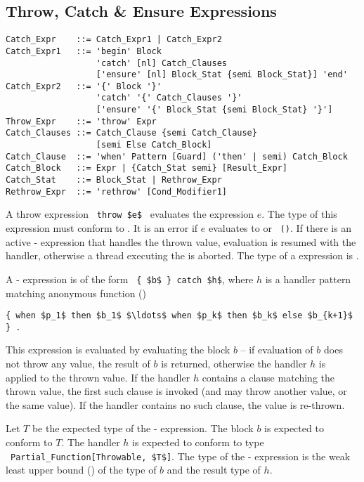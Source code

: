 \subsection{Throw, Catch \& Ensure Expressions}
\label{sec:throw-catch-expressions}

\syntax\begin{lstlisting}
Catch_Expr    ::= Catch_Expr1 | Catch_Expr2
Catch_Expr1   ::= 'begin' Block 
                  'catch' [nl] Catch_Clauses
                  ['ensure' [nl] Block_Stat {semi Block_Stat}] 'end'
Catch_Expr2   ::= '{' Block '}'
                  'catch' '{' Catch_Clauses '}'
                  ['ensure' '{' Block_Stat {semi Block_Stat} '}']
Throw_Expr    ::= 'throw' Expr
Catch_Clauses ::= Catch_Clause {semi Catch_Clause}
                  [semi Else Catch_Block]
Catch_Clause  ::= 'when' Pattern [Guard] ('then' | semi) Catch_Block
Catch_Block   ::= Expr | {Catch_Stat semi} [Result_Expr]
Catch_Stat    ::= Block_Stat | Rethrow_Expr
Rethrow_Expr  ::= 'rethrow' [Cond_Modifier1]
\end{lstlisting}

A throw expression ~\lstinline!throw $e$!~ evaluates the expression $e$. The type of this expression must conform to . It is an error if $e$ evaluates to  or ~\lstinline!()!. If there is an active - expression that handles the thrown value, evaluation is resumed with the handler, otherwise a thread executing the  is aborted. The type of a  expression is . 

A - expression is of the form ~\lstinline!{ $b$ } catch $h$!, where $h$ is a handler pattern matching anonymous function ()
\begin{lstlisting}
{ when $p_1$ then $b_1$ $\ldots$ when $p_k$ then $b_k$ else $b_{k+1}$ } .
\end{lstlisting}

This expression is evaluated by evaluating the block $b$ -- if evaluation of $b$ does not throw any value, the result of $b$ is returned, otherwise the handler $h$ is applied to the thrown value. If the handler $h$ contains a  clause matching the thrown value, the first such clause is invoked (and may throw another value, or the same value). If the handler contains no such clause, the value is re-thrown. 

Let $T$ be the expected type of the - expression. The block $b$ is expected to conform to $T$. The handler $h$ is expected to conform to type ~\lstinline!Partial_Function[Throwable, $T$]!. The type of the - expression is the weak least upper bound () of the type of $b$ and the result type of $h$. 

